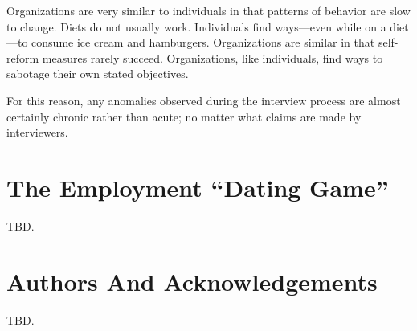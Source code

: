 Organizations are very similar to individuals in that patterns of behavior
are slow to change.  Diets do not usually work.  Individuals find ways---even
while on a diet---to consume ice cream and hamburgers.  Organizations are
similar in that self-reform measures rarely succeed.  Organizations, like
individuals, find ways to sabotage their own stated objectives.

For this reason, any anomalies observed during the interview process are
almost certainly chronic rather than acute; no matter what claims
are made by interviewers.



\section{The Employment ``Dating Game''}

TBD.


\section{Authors And Acknowledgements}

TBD.


